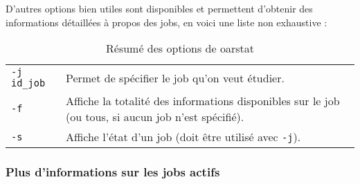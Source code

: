 \par D'autres options bien utiles sont disponibles et permettent d'obtenir des informations détaillées à propos des jobs, en voici une liste non exhaustive : \\

\begin{table}[h!]
  \centering

  \begin{tabular}{ll}
    \texttt{-j id\_job} & Permet de spécifier le job qu'on veut étudier. \\
    \texttt{-f} & Affiche la totalité des informations disponibles sur le job (ou tous, si aucun job n'est spécifié).\\
    \texttt{-s} & Affiche l'état d'un job (doit être utilisé avec \texttt{-j}).\\
  \end{tabular}

  \caption{Résumé des options de oarstat}
  
\end{table}


\subsubsection{Plus d'informations sur les jobs actifs}
\label{sec:plus-dinf-sur}



